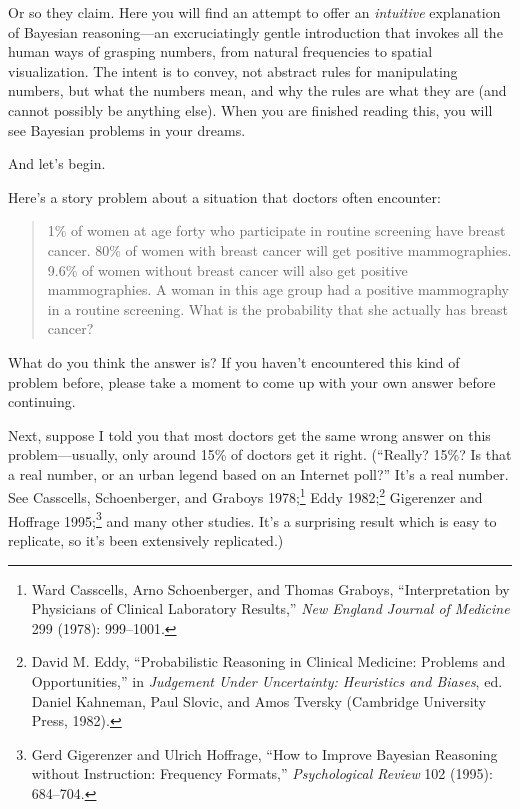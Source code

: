 {{{
 Or so they claim. Here you will find an attempt to offer an
\textit{intuitive} explanation of Bayesian reasoning---an
excruciatingly gentle introduction that invokes all the human ways of
grasping numbers, from natural frequencies to spatial visualization.
The intent is to convey, not abstract rules for manipulating numbers,
but what the numbers mean, and why the rules are what they are (and
cannot possibly be anything else). When you are finished reading this,
you will see Bayesian problems in your dreams.}

{
 And let's begin.}

\hr

{
 Here's a story problem about a situation that
doctors often encounter:}

\begin{quote}
{
 1\% of women at age forty who participate in routine screening
have breast cancer. 80\% of women with breast cancer will get positive
mammographies. 9.6\% of women without breast cancer will also get
positive mammographies. A woman in this age group had a positive
mammography in a routine screening. What is the probability that she
actually has breast cancer?}
\end{quote}

{
 What do you think the answer is? If you haven't
encountered this kind of problem before, please take a moment to come
up with your own answer before continuing.}

\hr

{
 Next, suppose I told you that most doctors get the same wrong
answer on this problem---usually, only around 15\% of doctors get it
right. (``Really? 15\%? Is that a real number, or an
urban legend based on an Internet poll?''
It's a real number. See Casscells, Schoenberger, and
Graboys 1978;\footnote{Ward Casscells, Arno Schoenberger, and Thomas Graboys,
``Interpretation by Physicians of Clinical Laboratory
Results,'' \textit{New England Journal of Medicine}
299 (1978): 999--1001.} Eddy 1982;\footnote{David M. Eddy, ``Probabilistic Reasoning in
Clinical Medicine: Problems and Opportunities,'' in
\textit{Judgement Under Uncertainty: Heuristics and Biases}, ed. Daniel
Kahneman, Paul Slovic, and Amos Tversky (Cambridge University Press,
1982).}
Gigerenzer and Hoffrage 1995;\footnote{Gerd Gigerenzer and Ulrich Hoffrage, ``How to
Improve Bayesian Reasoning without Instruction: Frequency
Formats,'' \textit{Psychological Review} 102 (1995):
684--704.} and many other
studies. It's a surprising result which is easy to
replicate, so it's been extensively replicated.)}

}}

